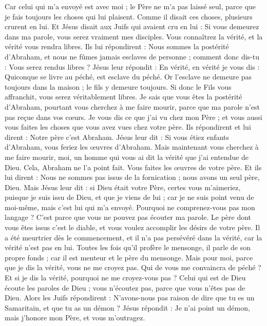 \begin{multicols}{2}
Car celui qui m'a envoyé est avec moi ; le Père ne m'a pas laissé seul, parce que je fais toujours les choses qui lui plaisent.
Comme il disait ces choses, plusieurs crurent en lui.
Et Jésus disait aux Juifs qui avaient cru en lui : Si vous demeurez dans ma parole, vous serez vraiment mes disciples.
Vous connaîtrez la vérité, et la vérité vous rendra libres.
Ils lui répondirent : Nous sommes la postérité d'Abraham, et nous ne fûmes jamais esclaves de personne ; comment donc dis-tu : Vous serez rendus libres ?
Jésus leur répondit : En vérité, en vérité je vous dis : Quiconque se livre au péché, est esclave du péché.
Or l'esclave ne demeure pas toujours dans la maison ; le fils y demeure toujours.
Si donc le Fils vous affranchit, vous serez véritablement libres.
Je sais que vous êtes la postérité d'Abraham, pourtant vous cherchez à me faire mourir, parce que ma parole n'est pas reçue dans vos cœurs.
Je vous dis ce que j'ai vu chez mon Père ; et vous aussi vous faites les choses que vous avez vues chez votre père.
Ils répondirent et lui dirent : Notre père c'est Abraham. Jésus leur dit : Si vous étiez enfants d'Abraham, vous feriez les œuvres d'Abraham.
Mais maintenant vous cherchez à me faire mourir, moi, un homme qui vous ai dit la vérité que j'ai entendue de Dieu. Cela, Abraham ne l'a point fait.
Vous faites les œuvres de votre père. Et ils lui dirent : Nous ne sommes pas issus de la fornication ; nous avons un seul père, Dieu.
Mais Jésus leur dit : si Dieu était votre Père, certes vous m'aimeriez, puisque je suis issu de Dieu, et que je viens de lui ; car je ne suis point venu de moi-même, mais c'est lui qui m'a envoyé.
Pourquoi ne comprenez-vous pas mon langage ? C'est parce que vous ne pouvez pas écouter ma parole.
Le père dont vous êtes issus c'est le diable, et vous voulez accomplir les désirs de votre père. Il a été meurtrier dès le commencement, et il n'a pas persévéré dans la vérité, car la vérité n'est pas en lui. Toutes les fois qu'il profère le mensonge, il parle de son propre fonds ; car il est menteur et le père du mensonge.
Mais pour moi, parce que je dis la vérité, vous ne me croyez pas.
Qui de vous me convaincra de péché ? Et si je dis la vérité, pourquoi ne me croyez-vous pas ?
Celui qui est de Dieu écoute les paroles de Dieu ; vous n'écoutez pas, parce que vous n'êtes pas de Dieu.
Alors les Juifs répondirent : N'avons-nous pas raison de dire que tu es un Samaritain, et que tu as un démon ?
Jésus répondit : Je n'ai point un démon, mais j'honore mon Père, et vous m'outragez.

\end{multicols}
